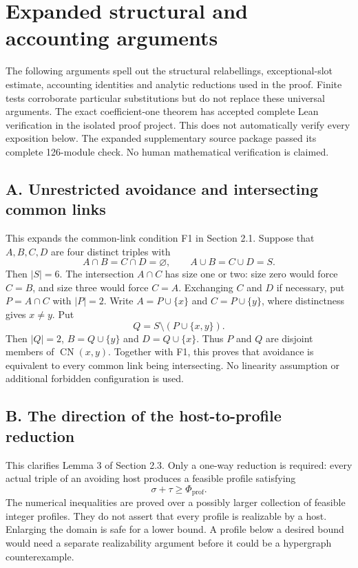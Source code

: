 \section{Expanded structural and accounting arguments}
\label{app:expanded}
The following arguments spell out the structural relabellings, exceptional-slot estimate, accounting identities and analytic reductions used in the proof. Finite tests corroborate particular substitutions but do not replace these universal arguments. The exact coefficient-one theorem has accepted complete Lean verification in the isolated proof project. This does not automatically verify every exposition below. The expanded supplementary source package passed its complete 126-module check. No human mathematical verification is claimed.

\subsection*{A. Unrestricted avoidance and intersecting common links}
This expands the common-link condition F1 in Section 2.1.
Suppose that $A,B,C,D$ are four distinct triples with
\[
 A\cap B=C\cap D=\varnothing,\qquad A\cup B=C\cup D=S.
\]
Then $|S|=6$. The intersection $A\cap C$ has size one or two: size zero would force $C=B$, and size three would force $C=A$. Exchanging $C$ and $D$ if necessary, put $P=A\cap C$ with $|P|=2$. Write $A=P\cup\{x\}$ and $C=P\cup\{y\}$, where distinctness gives $x\ne y$. Put
\[
 Q=S\setminus(P\cup\{x,y\}).
\]
Then $|Q|=2$, $B=Q\cup\{y\}$ and $D=Q\cup\{x\}$. Thus $P$ and $Q$ are disjoint members of $\operatorname{CN}(x,y)$. Together with F1, this proves that avoidance is equivalent to every common link being intersecting. No linearity assumption or additional forbidden configuration is used.

\subsection*{B. The direction of the host-to-profile reduction}
This clarifies Lemma 3 of Section 2.3. Only a one-way reduction is required: every actual triple of an avoiding host produces a feasible profile satisfying
\[
 \sigma+\tau\ge\Phi_{\mathrm{prof}}.
\]
The numerical inequalities are proved over a possibly larger collection of feasible integer profiles. They do not assert that every profile is realizable by a host. Enlarging the domain is safe for a lower bound. A profile below a desired bound would need a separate realizability argument before it could be a hypergraph counterexample.

